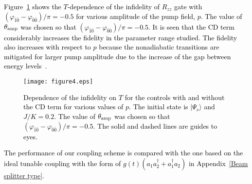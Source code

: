 \documentclass[%
 reprint,
 amsmath,amssymb,
 aps,
pra,
]{revtex4-2}
\begin{document}
\textcolor{black}{Figure~\ref{fid_fin_com_6_18_22_2} shows the $T$-dependence of the infidelity 
of $R_{zz}$ gate with $(\varphi_{\bar{1}\bar{0}} - \varphi_{\bar{0}\bar{0}})/\pi=-0.5$ for various amplitude of the pump field, $p$.
The value of  $\theta_{\rm amp}$ was chosen so that $(\varphi_{\bar{1}\bar{0}} - \varphi_{\bar{0}\bar{0}})/\pi=-0.5$.
It is seen that the CD term considerably increases the fidelity in the parameter range studied.
The fidelity also increases with respect to $p$ because the nonadiabatic transitions are mitigated for larger pump amplitude due to the increase of the gap between energy levels~\cite{Masuda2020}.}
\begin{figure}[h!]
\begin{center}
\texttt{[image: figure4.eps]}
\end{center}
\caption{
\textcolor{black}{
Dependence of the infidelity on $T$ for the controls with and without the CD term 
for various values of $p$.
The initial state is $|\Psi_s\rangle$ and $J/K=0.2$.
The value of  $\theta_{\rm amp}$ was chosen so that  $(\varphi_{\bar{1}\bar{0}} - \varphi_{\bar{0}\bar{0}})/\pi=-0.5$.
The solid and dashed lines are guides to eyes.
}
}
\label{fid_fin_com_6_18_22_2}
\end{figure}
\textcolor{black}{The performance of our coupling scheme is compared with the one based on the ideal tunable coupling with the form of $g(t)(a_1a_2^\dagger + a_1^\dagger a_2)$ in Appendix~\ref{Beam splitter type}.}
\end{document}
